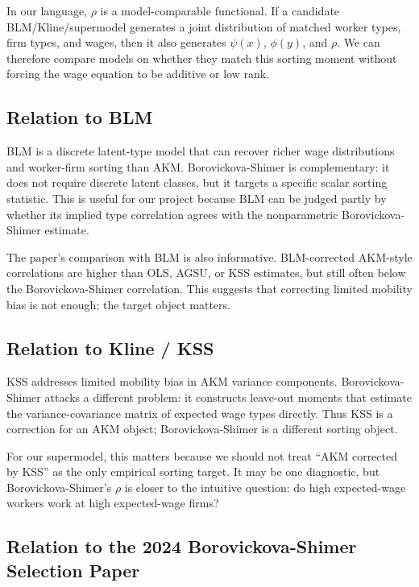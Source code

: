 \documentclass[11pt]{article}
\begin{document}
In our language, $\rho$ is a model-comparable functional. If a candidate BLM/Kline/supermodel generates a joint distribution of matched worker types, firm types, and wages, then it also generates $\psi(x)$, $\phi(y)$, and $\rho$. We can therefore compare models on whether they match this sorting moment without forcing the wage equation to be additive or low rank.

\subsection{Relation to BLM}

BLM is a discrete latent-type model that can recover richer wage distributions and worker-firm sorting than AKM. Borovickova-Shimer is complementary: it does not require discrete latent classes, but it targets a specific scalar sorting statistic. This is useful for our project because BLM can be judged partly by whether its implied type correlation agrees with the nonparametric Borovickova-Shimer estimate.

The paper's comparison with BLM is also informative. BLM-corrected AKM-style correlations are higher than OLS, AGSU, or KSS estimates, but still often below the Borovickova-Shimer correlation. This suggests that correcting limited mobility bias is not enough; the target object matters.

\subsection{Relation to Kline / KSS}

KSS addresses limited mobility bias in AKM variance components. Borovickova-Shimer attacks a different problem: it constructs leave-out moments that estimate the variance-covariance matrix of expected wage types directly. Thus KSS is a correction for an AKM object; Borovickova-Shimer is a different sorting object.

For our supermodel, this matters because we should not treat ``AKM corrected by KSS'' as the only empirical sorting target. It may be one diagnostic, but Borovickova-Shimer's $\rho$ is closer to the intuitive question: do high expected-wage workers work at high expected-wage firms?

\subsection{Relation to the 2024 Borovickova-Shimer Selection Paper}
\end{document}
